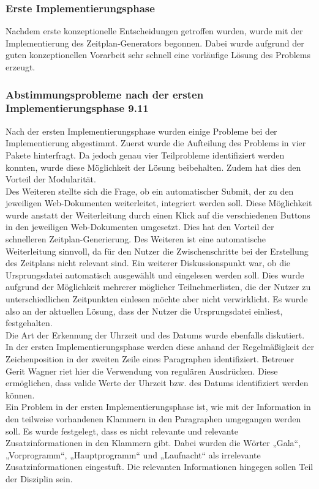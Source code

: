 {\subsubsection{Erste Implementierungsphase}
Nachdem erste konzeptionelle Entscheidungen getroffen wurden, wurde mit der Implementierung des Zeitplan-Generators begonnen. Dabei wurde aufgrund der guten konzeptionellen Vorarbeit sehr schnell eine vorläufige Lösung des Problems erzeugt.
 
\subsubsection{Abstimmungsprobleme nach der ersten Implementierungsphase 9.11}
Nach der ersten Implementierungsphase wurden einige Probleme bei der Implementierung abgestimmt. Zuerst wurde die Aufteilung des Problems in vier Pakete hinterfragt. Da jedoch genau vier Teilprobleme identifiziert werden konnten, wurde diese Möglichkeit der Lösung beibehalten. Zudem hat dies den Vorteil der Modularität.\\
Des Weiteren stellte sich die Frage, ob ein automatischer Submit, der zu den jeweiligen Web-Dokumenten weiterleitet, integriert werden soll. Diese Möglichkeit wurde anstatt der Weiterleitung durch einen Klick auf die verschiedenen Buttons in den jeweiligen Web-Dokumenten umgesetzt. Dies hat den Vorteil der schnelleren Zeitplan-Generierung. Des Weiteren ist eine automatische Weiterleitung sinnvoll, da für den Nutzer die Zwischenschritte bei der Erstellung des Zeitplans nicht relevant sind. 
Ein weiterer Diskussionspunkt war, ob die Ursprungsdatei automatisch ausgewählt und eingelesen werden soll. Dies wurde aufgrund der Möglichkeit mehrerer möglicher Teilnehmerlisten, die der Nutzer zu unterschiedlichen Zeitpunkten einlesen möchte aber nicht verwirklicht. Es wurde also an der aktuellen Lösung, dass der Nutzer die Ursprungsdatei einliest, festgehalten.\\
Die Art der Erkennung der Uhrzeit und des Datums wurde ebenfalls diskutiert. In der ersten Implementierungsphase werden diese anhand der Regelmäßigkeit der Zeichenposition in der zweiten Zeile eines Paragraphen identifiziert. Betreuer Gerit Wagner riet hier die Verwendung von regulären Ausdrücken. Diese ermöglichen, dass valide Werte der Uhrzeit bzw. des Datums identifiziert werden können.\\
Ein Problem in der ersten Implementierungsphase ist, wie mit der Information in den teilweise vorhandenen Klammern in den Paragraphen umgegangen werden soll. Es wurde festgelegt, dass es nicht relevante und relevante Zusatzinformationen in den Klammern gibt. Dabei wurden die Wörter „Gala“, „Vorprogramm“, „Hauptprogramm“ und „Laufnacht“ als irrelevante Zusatzinformationen eingestuft. Die relevanten Informationen hingegen sollen Teil der Disziplin sein.\\
}
